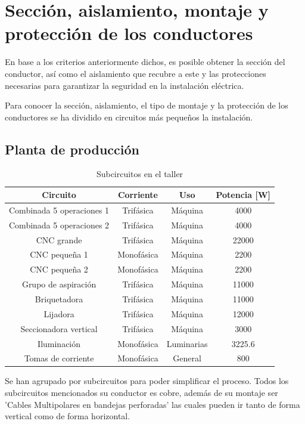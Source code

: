 \documentclass[../main.tex]{subfiles}
\begin{document}
\section{Sección, aislamiento, montaje y protección de los conductores}

En base a los criterios anteriormente dichos, es posible obtener la sección del conductor, así como el aislamiento que recubre a este y las protecciones necesarias para garantizar la seguridad en la instalación eléctrica. 

Para conocer la sección, aislamiento, el tipo de montaje y la protección de los conductores se ha dividido en circuitos más pequeños la instalación. 

\subsection{Planta de producción}


\begin{table}[H]
    \centering
    \begin{tabular}{c|c|c|c}
        Circuito & Corriente & Uso & Potencia [W]  \\ \hline
        Combinada 5 operaciones 1 & Trifásica & Máquina & 4000 \\
        Combinada 5 operaciones 2 & Trifásica & Máquina & 4000 \\
         CNC grande & Trifásica & Máquina & 22000 \\
        CNC pequeña 1 & Monofásica & Máquina & 2200 \\
        CNC pequeña 2 & Monofásica & Máquina & 2200 \\
        Grupo de aspiración & Trifásica & Máquina & 11000 \\
        Briquetadora & Trifásica & Máquina & 11000 \\
         Lijadora & Trifásica & Máquina & 12000 \\
        Seccionadora vertical & Trifásica & Máquina & 3000 \\
        Iluminación & Monofásica & Luminarias & 3225.6 \\
        Tomas de corriente & Monofásica & General & 800 \\
    \end{tabular}
    \caption{Subcircuitos en el taller} 
\end{table}

Se han agrupado por subcircuitos para poder simplificar el proceso. Todos los subcircuitos mencionados su conductor es cobre, además de su montaje ser 'Cables Multipolares en bandejas perforadas' las cuales pueden ir tanto de forma vertical como de forma horizontal.
\end{document}
